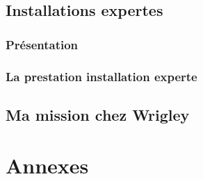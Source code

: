 \documentclass[12pt, a4paper]{article}
\begin{document}
\subsection{Installations expertes}
\subsubsection{Présentation}
\subsubsection{La prestation installation experte}






\subsection{Ma mission chez Wrigley}
\section{Annexes}
\end{document}
